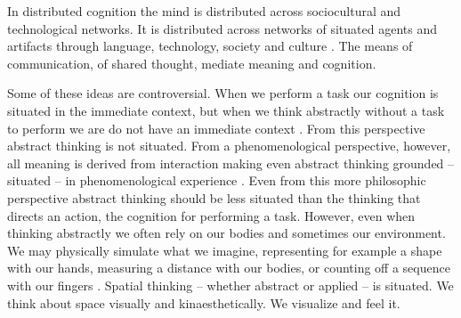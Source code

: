 \documentclass{article}
\begin{document}
In distributed cognition the mind is distributed across sociocultural and technological networks. It is distributed across networks of situated agents and artifacts through language, technology, society and culture \citep{Hardy-Vallee2008}. 
The means of communication, of shared thought, mediate meaning and cognition.  


Some of these ideas are controversial. 
When we perform a task our cognition is situated in the immediate context, 
but when we think abstractly without a task to perform we are do not have an immediate context \citep{Wilson2002}. From this perspective abstract thinking is not situated. 
From a phenomenological perspective, however, all meaning is derived from interaction
making even abstract thinking grounded -- situated -- in phenomenological experience \citep{Dourish2001}.  
Even from this more philosophic perspective abstract thinking should be less situated than the thinking that directs an action, the cognition for performing a task. However, even when thinking abstractly we often rely on our bodies and sometimes our environment. We may physically simulate what we imagine, representing for example a shape with our hands, measuring a distance with our bodies, or counting off a sequence with our fingers \citep{Wilson2002}. 
Spatial thinking -- whether abstract or applied -- is situated. We think about space visually and kinaesthetically. We visualize and feel it. 

\end{document}
